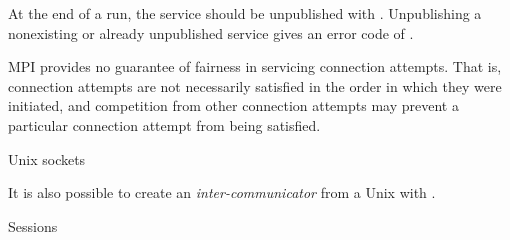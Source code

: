 At the end of a run, the service should be unpublished with
.
Unpublishing a nonexisting or already unpublished service gives an
error code of .

MPI provides no guarantee of fairness in servicing connection
attempts. That is, connection attempts are not necessarily satisfied
in the order in which they were initiated, and competition from other
connection attempts may prevent a particular connection attempt from
being satisfied.

 {Unix sockets}

It is also possible to create an
\emph{inter-communicator} from a Unix
with
.

 {Sessions}
\label{sec:session}

